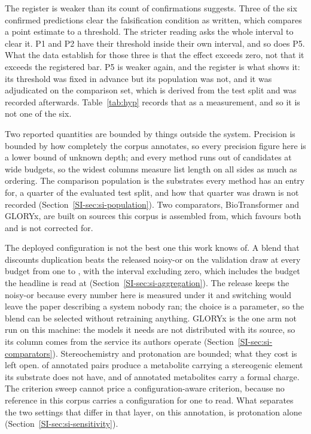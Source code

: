 The register is weaker than its count of confirmations suggests. Three of the six confirmed
predictions clear the falsification condition as written, which compares a point estimate to a
threshold. The stricter reading asks the whole interval to clear it. P1 and P2 have
their threshold inside their own interval, and so does P5. What the data establish for those three
is that the effect exceeds zero, not that it exceeds the registered bar. P5 is weaker again, and
the register is what shows it: its threshold was fixed in advance but its population was not, and
it was adjudicated on the comparison set, which is derived from the test split and was recorded
afterwards. Table~\ref{tab:hyp} records that as a measurement, and so
it is not one of the six.

Two reported quantities are bounded by things outside the system. Precision is bounded by how
completely the corpus annotates, so every precision figure here is a lower bound of unknown depth;
and every method runs out of candidates at wide budgets, so the widest columns measure list length
on all sides as much as ordering. The comparison population is the \numPopulationN{} substrates every method has an entry for, a quarter of the evaluated test split, and how that quarter was drawn is not recorded (Section~\ref{SI-sec:si-population}). Two comparators, BioTransformer and GLORYx, are built on sources this corpus is assembled
from, which favours both and is not corrected for.

The deployed configuration is not the best one this work knows of. A blend that discounts
duplication beats the released noisy-or on the validation draw at every budget from one to
\numAggvalHybridwinsmax{}, with the interval excluding zero, which includes the budget the headline
is read at (Section~\ref{SI-sec:si-aggregation}). The release keeps the noisy-or because every
number here is measured under it and switching would leave the paper describing a system nobody
ran; the choice is a parameter, so the blend can be selected without
retraining anything. GLORYx is the one arm not run on this machine: the models it needs are not distributed with its
source, so its column comes from the service its authors operate
(Section~\ref{SI-sec:si-comparators}). Stereochemistry and protonation are bounded; what they cost is left open. \numStereoSharePct{} of annotated
pairs produce a metabolite carrying a stereogenic element its substrate does not have, and
\numChargeSharePct{} of annotated metabolites carry a formal charge. The criterion sweep cannot
price a configuration-aware criterion, because no reference in this corpus carries a configuration
for one to read. What separates the two settings that differ in that layer, on this annotation, is protonation alone (Section~\ref{SI-sec:si-sensitivity}).

